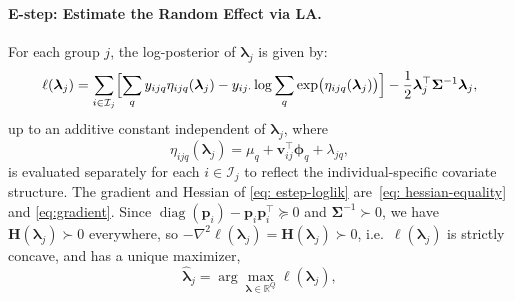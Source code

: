 \paragraph*{E-step: Estimate the Random Effect via LA.}
For each group $j$, the log-posterior of $\bm{\lambda}_{j}$ is given by:
\begin{equation}
    \ell(\bm{\lambda}_{j})=\sum_{i\in \mathcal{I}_{j}}\Bigl[\sum_{q}y_{ijq}\eta_{ijq}(\bm{\lambda}_{j})-y_{ij\cdot}\log \sum_{q}\exp\bigl(\eta_{ijq}(\bm{\lambda}_{j})\bigr)\Bigr]-\frac{1}{2}\bm{\lambda}_{j}^{\top}\bm{\Sigma}^{-1}\bm{\lambda}_{j},
    \label{eq: estep-loglik}
\end{equation}
up to an additive constant independent of $\bm{\lambda}_{j}$, where 
\begin{equation}
    \eta_{ijq}(\bm{\lambda}_{j})=\mu_{q}+\bm{v}_{ij}^{\top}\bm{\phi}_{q}+\lambda_{jq},
    \label{eq: individualcovariate}
\end{equation}
is evaluated separately for each $i\in \mathcal{I}_{j}$ to reflect the individual-specific covariate structure.
The gradient and Hessian of \eqref{eq: estep-loglik} are~\eqref{eq: hessian-equality} and \eqref{eq:gradient}. Since $\operatorname{diag}(\bm p_i)-\bm p_i\bm p_i^\top\succeq 0$ and $\bm{\Sigma}^{-1}\succ 0$, we have $\mathbf{H}(\bm{\lambda}_{j})\succ 0$ everywhere, so $-\nabla^2\ell(\bm\lambda_j) = \mathbf H(\bm\lambda_j) \succ 0$, i.e.\ $\ell(\bm{\lambda}_{j})$ is strictly concave, and has a unique maximizer,
\begin{equation}
     \hat{\bm{\lambda}}_{j}
     = \arg\max_{\bm{\lambda}\in \mathbb{R}^{Q}}
     \ell(\bm{\lambda}_{j}),
     \label{eq:maximizer}
\end{equation}
